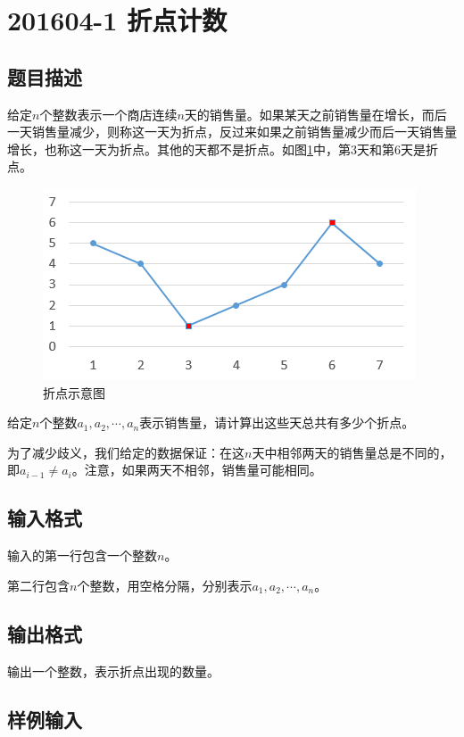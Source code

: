 \section{201604-1 折点计数}

\subsection{题目描述}%

给定$n$个整数表示一个商店连续$n$天的销售量。如果某天之前销售量在增长，而后一天销售量减少，则称这一天为折点，反过来如果之前销售量减少而后一天销售量增长，也称这一天为折点。其他的天都不是折点。如图\ref{fig:201604-1-1}中，第3天和第6天是折点。

\begin{figure}[H]
    \centering
    \includegraphics{chapter3/exam201604_1/p1.png}
    \caption{折点示意图}
    \label{fig:201604-1-1}
\end{figure}

给定$n$个整数$a_1,a_2,\cdots,a_n$表示销售量，请计算出这些天总共有多少个折点。

为了减少歧义，我们给定的数据保证：在这$n$天中相邻两天的销售量总是不同的，即$a_{i-1} \neq a_i$。注意，如果两天不相邻，销售量可能相同。

\subsection{输入格式}

输入的第一行包含一个整数$n$。

第二行包含$n$个整数，用空格分隔，分别表示$a_1,a_2,\cdots,a_n$。

\subsection{输出格式}

输出一个整数，表示折点出现的数量。

\subsection{样例输入}

